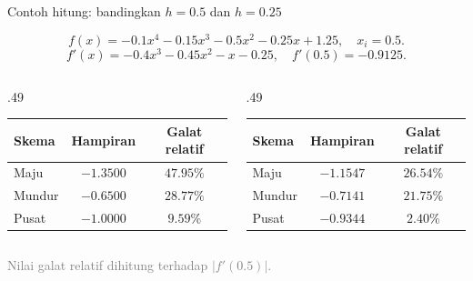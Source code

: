 \documentclass[aspectratio=169,10pt]{beamer}
\newcommand{\smallgray}[1]{\textcolor{GrayText}{\scriptsize #1}}
\begin{document}
\begin{frame}{Contoh hitung: bandingkan $h=0.5$ dan $h=0.25$}
\scriptsize
\begin{bluebox}
\[
f(x)=-0.1x^4-0.15x^3-0.5x^2-0.25x+1.25,
\quad x_i=0.5.
\]
\[
f'(x)=-0.4x^3-0.45x^2-x-0.25,
\quad f'(0.5)=-0.9125.
\]
\end{bluebox}
\begin{columns}[T,totalwidth=\textwidth]
\begin{column}{.49\textwidth}
\begin{orangebox}[h = 0.5]
\begin{tabular}{lcc}
\toprule
Skema & Hampiran & Galat relatif\\
\midrule
Maju & $-1.3500$ & $47.95\%$\\
Mundur & $-0.6500$ & $28.77\%$\\
Pusat & $-1.0000$ & $9.59\%$\\
\bottomrule
\end{tabular}
\end{orangebox}
\end{column}
\begin{column}{.49\textwidth}
\begin{greenbox}[h = 0.25]
\begin{tabular}{lcc}
\toprule
Skema & Hampiran & Galat relatif\\
\midrule
Maju & $-1.1547$ & $26.54\%$\\
Mundur & $-0.7141$ & $21.75\%$\\
Pusat & $-0.9344$ & $2.40\%$\\
\bottomrule
\end{tabular}
\end{greenbox}
\end{column}
\end{columns}
\vspace{1mm}
\smallgray{Nilai galat relatif dihitung terhadap $|f'(0.5)|$.}
\end{frame}
\end{document}
